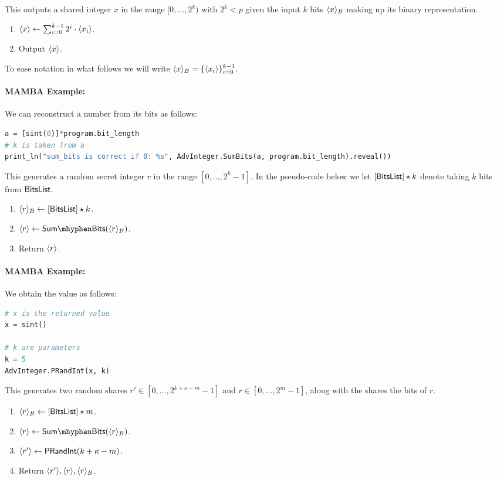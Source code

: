 This outputs a shared integer $x$ in the range
$[0,\ldots,2^k)$ with $2^k<p$ given the input $k$ bits
$\langle x \rangle_B$ making up its binary representation.
\begin{enumerate}
  \item $\langle x \rangle \leftarrow \sum_{i=0}^{k-1} 2^i \cdot \langle x_i \rangle$.
  \item Output $\langle x \rangle$.
\end{enumerate}
To ease notation in what follows we will write
$\langle x \rangle_B = \{\langle x_i \rangle\}_{i=0}^{k-1}$.

\paragraph{MAMBA Example:}  We can reconstruct a number from its bits as follows:
\begin{lstlisting}[language={python}]
a = [sint(0)]*program.bit_length
# k is taken from a
print_ln("sum_bits is correct if 0: %s", AdvInteger.SumBits(a, program.bit_length).reveal())
\end{lstlisting}

This generates a random secret integer $r$ in the range $[0,\ldots,2^k-1]$.
In the pseudo-code below we let $[\mathsf{BitsList}]\star k$ denote taking
$k$ bits from $\mathsf{BitsList}$.
\begin{enumerate}
  \item $\langle r \rangle_B \leftarrow [\mathsf{BitsList}]\star k$.
  \item $\sshare{r} \asn \mathsf{Sum\mhyphen Bits}(\sshare{r}_B)$.
  \item Return $\langle r \rangle$.
\end{enumerate}
\paragraph{MAMBA Example:}  We obtain the value as follows:
\begin{lstlisting}[language={python}]
# x is the returned value
x = sint()

# k are parameters
k = 5
AdvInteger.PRandInt(x, k)
\end{lstlisting}

This generates two random shares $r' \in [0,\ldots,2^{k+\kappa-m}-1]$
and $r \in [0,\ldots,2^m-1]$, along with the shares the bits of $r$.
\begin{enumerate}
  \item $\langle r \rangle_B \leftarrow [\mathsf{BitsList}]\star m$.
  \item $\sshare{r} \asn \mathsf{Sum\mhyphen Bits}(\sshare{r}_B)$.
  \item $\langle r' \rangle \leftarrow \mathsf{PRandInt}(k+\kappa-m)$.
  \item Return $\langle r' \rangle, \langle r \rangle, \langle r \rangle_B$.
\end{enumerate}
